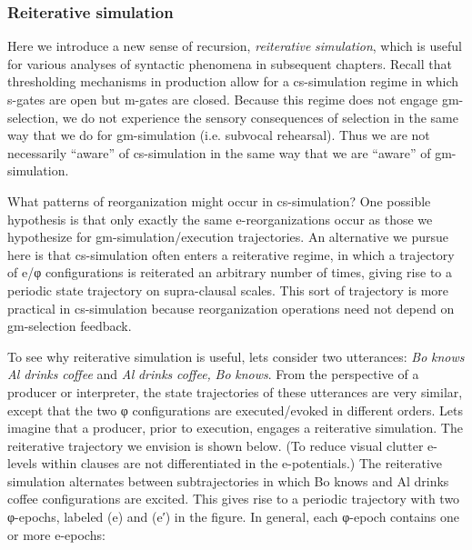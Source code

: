 \subsubsection{Reiterative simulation}

Here we introduce a new sense of recursion, \textit{reiterative} \textit{simulation}, which is useful for various analyses of syntactic phenomena in subsequent chapters. Recall that thresholding mechanisms in production allow for a cs-simulation regime in which s-gates are open but m-gates are closed. Because this regime does not engage gm-selection, we do not experience the sensory consequences of selection in the same way that we do for gm-simulation (i.e. subvocal rehearsal). Thus we are not necessarily “aware” of cs-simulation in the same way that we are “aware” of gm-simulation.

  What patterns of reorganization might occur in cs-simulation? One possible hypothesis is that only exactly the same e-reorganizations occur as those we hypothesize for gm-simulation/execution trajectories. An alternative we pursue here is that cs-simulation often enters a reiterative regime, in which a trajectory of e/φ configurations is reiterated an arbitrary number of times, giving rise to a periodic state trajectory on supra-clausal scales. This sort of trajectory is more practical in cs-simulation because reorganization operations need not depend on gm-selection feedback.

  To see why reiterative simulation is useful, lets consider two utterances: \textit{Bo} \textit{knows} \textit{Al} \textit{drinks} \textit{coffee} and \textit{Al} \textit{drinks} \textit{coffee,} \textit{Bo} \textit{knows}. From the perspective of a producer or interpreter, the state trajectories of these utterances are very similar, except that the two φ configurations are executed/evoked in different orders. Lets imagine that a producer, prior to execution, engages a reiterative simulation. The reiterative trajectory we envision is shown below. (To reduce visual clutter e-levels within clauses are not differentiated in the e-potentials.) The reiterative simulation alternates between subtrajectories in which {\textbar}Bo knows{\textbar} and {\textbar}Al drinks coffee{\textbar} configurations are excited. This gives rise to a periodic trajectory with two φ-epochs,  labeled (e) and (e′) in the figure. In general, each φ-epoch contains one or more e-epochs:

